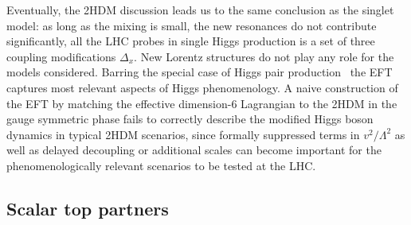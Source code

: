 
Eventually, the 2HDM discussion leads us to the same conclusion as the
singlet model: as long as the mixing is small, the new resonances do
not contribute significantly, all the LHC probes in single Higgs
production is a set of three coupling modifications $\Delta_x$. New
Lorentz structures do not play any role for the models
considered. Barring the special case of Higgs pair
production~\cite{Hespel:2014sla,higgspair2hdm} the EFT captures most
relevant aspects of Higgs phenomenology.  A naive construction of the
EFT by matching the effective dimension-6 Lagrangian to the 2HDM in
the gauge symmetric phase fails to correctly describe the modified
Higgs boson dynamics in typical 2HDM scenarios, since formally
suppressed terms in $v^2/\Lambda^2$ as well as delayed decoupling or
additional scales can become important for the phenomenologically
relevant scenarios to be tested at the LHC.



\subsection{Scalar top partners}
\label{sec:validity_partners}

